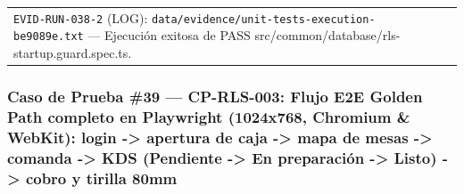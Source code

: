 \documentclass[10pt,a4paper]{article}
\begin{document}
{\begin{longtable}[]{@{}
  >{\raggedright\arraybackslash}p{}
  >{\raggedright\arraybackslash}p{}@{}}
\begin{minipage}[t]{\linewidth}
\texttt{EVID-{}\allowbreak{}RUN-{}\allowbreak{}038-{}\allowbreak{}2} (LOG): \texttt{data/\allowbreak{}evidence/\allowbreak{}unit-{}\allowbreak{}tests-{}\allowbreak{}execution-{}\allowbreak{}be9089e.\allowbreak{}txt} --- Ejecución exitosa de PASS src/common/database/rls-startup.guard.spec.ts.\strut
\end{minipage} \\
\end{longtable}
}

\endgroup\medskip


\subsubsection{Caso de Prueba \#39 --- CP-RLS-003: Flujo E2E Golden Path completo en Playwright (1024x768, Chromium \& WebKit): login -\textgreater{} apertura de caja -\textgreater{} mapa de mesas -\textgreater{} comanda -\textgreater{} KDS (Pendiente -\textgreater{} En preparación -\textgreater{} Listo) -\textgreater{} cobro y tirilla 80mm}\label{caso-de-prueba-39--cp-rls-003-flujo-e2e-golden-path-completo-en-playwright-1024x768-chromium--webkit-login---apertura-de-caja---mapa-de-mesas---comanda---kds-pendiente---en-preparaciuxf3n---listo---cobro-y-tirilla-80mm}

\begingroup\singlespacing\footnotesize\setlength{\parskip}{0pt}
\end{document}
